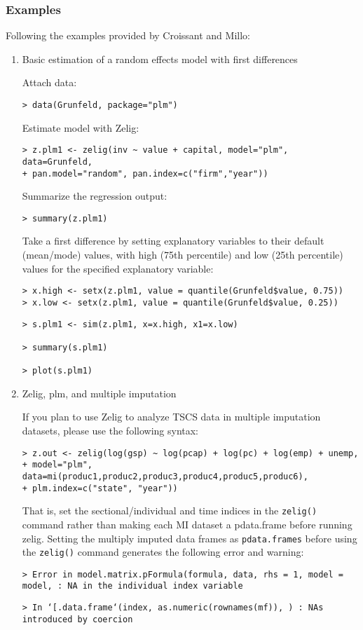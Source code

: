 \subsubsection{Examples}
Following the examples provided by Croissant and Millo:
\begin{enumerate}
\item Basic estimation of a random effects model with first differences

Attach data:

\texttt{> data(Grunfeld, package="plm")}

Estimate model with Zelig:

\begin{verbatim}
> z.plm1 <- zelig(inv ~ value + capital, model="plm", data=Grunfeld, 
+ pan.model="random", pan.index=c("firm","year"))
\end{verbatim}

Summarize the regression output:

\texttt{> summary(z.plm1)}

Take a first difference by setting explanatory variables to their default (mean/mode) values, with high (75th percentile) and low (25th percentile) values for the specified explanatory variable:

\begin{verbatim}
> x.high <- setx(z.plm1, value = quantile(Grunfeld$value, 0.75))
> x.low <- setx(z.plm1, value = quantile(Grunfeld$value, 0.25))
\end{verbatim}

\begin{verbatim}
> s.plm1 <- sim(z.plm1, x=x.high, x1=x.low)

> summary(s.plm1)

> plot(s.plm1)
\end{verbatim}


\item Zelig, plm, and multiple imputation

If you plan to use Zelig to analyze TSCS data in multiple imputation datasets, please use the following syntax:
\begin{verbatim}
> z.out <- zelig(log(gsp) ~ log(pcap) + log(pc) + log(emp) + unemp, 
+ model="plm", data=mi(produc1,produc2,produc3,produc4,produc5,produc6), 
+ plm.index=c("state", "year"))
\end{verbatim}
That is, set the sectional/individual and time indices in the \texttt{zelig()} command rather than making each MI dataset a pdata.frame before running zelig.
Setting the multiply imputed data frames as \texttt{pdata.frames} before using the \texttt{zelig()} command generates the following error and warning:

\texttt{> Error in model.matrix.pFormula(formula, data, rhs = 1, model = model,  : NA in the individual index variable}
  
\texttt{> In `[.data.frame`(index, as.numeric(rownames(mf)), ) : NAs introduced by coercion}
  
\end{enumerate}


